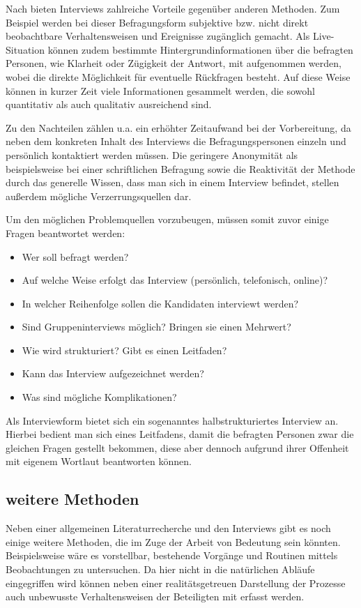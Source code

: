 Nach \citet{Doering.2015} bieten Interviews zahlreiche Vorteile gegenüber anderen Methoden. Zum Beispiel werden bei dieser Befragungsform subjektive bzw. nicht direkt beobachtbare Verhaltensweisen und Ereignisse zugänglich gemacht. Als Live-Situation können zudem bestimmte Hintergrundinformationen über die befragten Personen, wie Klarheit oder Zügigkeit der Antwort, mit aufgenommen werden, wobei die direkte Möglichkeit für eventuelle Rückfragen besteht. Auf diese Weise können in kurzer Zeit viele Informationen gesammelt werden, die sowohl quantitativ als auch qualitativ ausreichend sind.

Zu den Nachteilen zählen u.a. ein erhöhter Zeitaufwand bei der Vorbereitung, da neben dem konkreten Inhalt des Interviews die Befragungspersonen einzeln und persönlich kontaktiert werden müssen. Die geringere Anonymität als beispielsweise bei einer schriftlichen Befragung sowie die Reaktivität der Methode durch das generelle Wissen, dass man sich in einem Interview befindet, stellen außerdem mögliche Verzerrungsquellen dar.

Um den möglichen Problemquellen vorzubeugen, müssen somit zuvor einige Fragen beantwortet werden:
\begin{itemize}
	\item Wer soll befragt werden?
	\item Auf welche Weise erfolgt das Interview (persönlich, telefonisch, online)?
	\item In welcher Reihenfolge sollen die Kandidaten interviewt werden?
	\item Sind Gruppeninterviews möglich? Bringen sie einen Mehrwert?
	\item Wie wird strukturiert? Gibt es einen Leitfaden?
	\item Kann das Interview aufgezeichnet werden?
	\item Was sind mögliche Komplikationen?
\end{itemize}

Als Interviewform bietet sich ein sogenanntes halbstrukturiertes Interview an. Hierbei bedient man sich eines Leitfadens, damit die befragten Personen zwar die gleichen Fragen gestellt bekommen, diese aber dennoch aufgrund ihrer Offenheit mit eigenem Wortlaut beantworten können.

\subsection{weitere Methoden}

Neben einer allgemeinen Literaturrecherche und den Interviews gibt es noch einige weitere Methoden, die im Zuge der Arbeit von Bedeutung sein könnten. Beispielsweise wäre es vorstellbar, bestehende Vorgänge und Routinen mittels Beobachtungen zu untersuchen. Da hier nicht in die natürlichen Abläufe eingegriffen wird können neben einer realitätsgetreuen Darstellung der Prozesse auch unbewusste Verhaltensweisen der Beteiligten mit erfasst werden.

